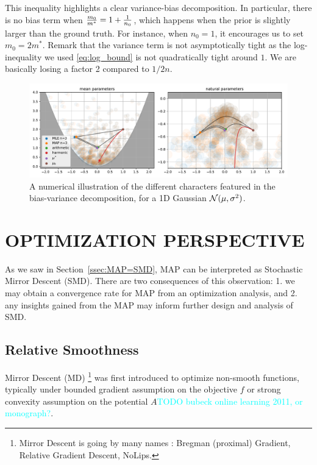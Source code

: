 \documentclass[twoside]{article}
\let\oldsection\section
\renewcommand{\section}[1]{\oldsection{\texorpdfstring{\uppercase{#1}}{#1}}}
\newcommand{\TODO}[1]{\textcolor{cyan}{TODO #1}}
\newcommand{\logpart}{A}
\newcommand{\m}{m}
\begin{document}
This inequality highlights a clear variance-bias decomposition.
In particular, there is no bias term when $\frac{\m_0}{\m^*} =1 + \inv{n_0} $, which happens when the prior is slightly larger than the ground truth.  For instance, when $n_0=1$, it encourages us to set $\m_0 = 2 \m^*$.
Remark that the variance term is not asymptotically tight as the log-inequality we used \eqref{eq:log_bound} is not quadratically tight around $1$. We are basically losing a factor 2 compared to $1/2n$.


\begin{figure}[t]
	\centering
	\includegraphics[width=\textwidth]{figs/thales/numerical_schema_n=3.pdf}
	\caption{A numerical illustration of the different characters featured in the bias-variance decomposition, for a 1D Gaussian ${\mathcal N}(\mu, \sigma^2)$.}
	\label{fig:bias-variance-numerical}
\end{figure}


\section{Optimization Perspective}
\label{sec:optimization}
As we saw in Section~\ref{ssec:MAP=SMD}, MAP can be interpreted as Stochastic Mirror Descent (SMD). 
There are two consequences of this observation: 1. we may obtain a convergence rate for MAP from an optimization analysis, and 2. any insights gained from the MAP may inform further design and analysis of SMD.

\subsection{Relative Smoothness}
Mirror Descent (MD) \footnote{Mirror Descent is going by many names : Bregman (proximal) Gradient, Relative Gradient Descent, NoLips.} \citep{nemirovski1983problem, beck2003mirror} was first introduced to optimize non-smooth functions, typically under bounded gradient assumption on the objective $f$ or strong convexity assumption on the potential $\logpart$\citep{bubeck}\TODO{bubeck online learning 2011, or monograph?}.
\end{document}
